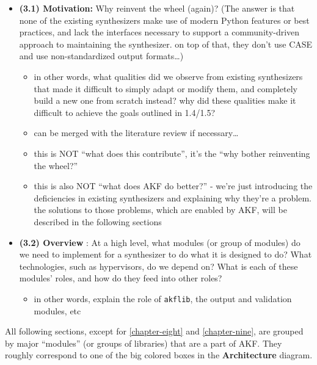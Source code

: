 \begin{itemize}
\tightlist
\item
  \textbf{(3.1) Motivation:} Why reinvent the wheel (again)? (The answer
  is that none of the existing synthesizers make use of modern Python
  features or best practices, and lack the interfaces necessary to
  support a community-driven approach to maintaining the synthesizer. on
  top of that, they don't use CASE and use non-standardized output
  formats\ldots)

  \begin{itemize}
  \tightlist
  \item
    in other words, what qualities did we observe from existing
    synthesizers that made it difficult to simply adapt or modify them,
    and completely build a new one from scratch instead? why did these
    qualities make it difficult to achieve the goals outlined in
    1.4/1.5?
  \item
    can be merged with the literature review if necessary\ldots{}
  \item
    this is NOT ``what does this contribute'', it's the ``why bother
    reinventing the wheel?''
  \item
    this is also NOT ``what does AKF do better?'' - we're just
    introducing the deficiencies in existing synthesizers and explaining
    why they're a problem. the solutions to those problems, which are
    enabled by AKF, will be described in the following sections
  \end{itemize}
\item
  \textbf{(3.2) Overview} : At a high level, what modules (or group of
  modules) do we need to implement for a synthesizer to do what it is
  designed to do? What technologies, such as hypervisors, do we depend
  on? What is each of these modules' roles, and how do they feed into
  other roles?

  \begin{itemize}
  \tightlist
  \item
    in other words, explain the role of
    \passthrough{\lstinline!akflib!}, the output and validation modules,
    etc
  \end{itemize}
\end{itemize}

All following sections, except for \autoref{chapter-eight} and
\autoref{chapter-nine}, are grouped by major ``modules'' (or groups
of libraries) that are a part of AKF. They roughly correspond to one of
the big colored boxes in the \textbf{Architecture} diagram.

